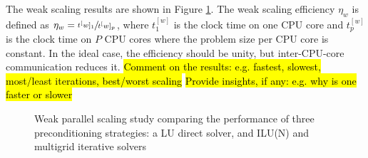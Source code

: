 \documentclass[sn-mathphys,Numbered]{sn-jnl}%
\begin{document}
The weak scaling results are shown in Figure \ref{fig:parallelisation_weak}.
The weak scaling efficiency $\eta_w$ is defined as $\eta_w = \sfrac{t^[w]_1}{t^[w]_p}$, where $t^[w]_1$ is the clock time on one CPU core and $t^[w]_p$ is the clock time on $P$ CPU cores where the problem size per CPU core is constant.
In the ideal case, the efficiency should be unity, but inter-CPU-core communication reduces it.
\hl{Comment on the results: e.g. fastest, slowest, most/least iterations, best/worst scaling}
\hl{Provide insights, if any: e.g. why is one faster or slower}
\begin{figure}[htbp]
	\centering
	\caption{Weak parallel scaling study comparing the performance of three preconditioning strategies: a LU direct solver, and ILU(N) and multigrid iterative solvers}
	\label{fig:parallelisation_weak}
\end{figure}

\end{document}
